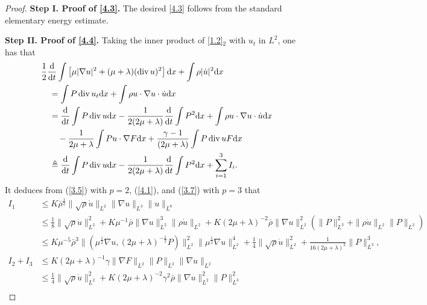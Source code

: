 \documentclass[11pt]{article}
\DeclareMathOperator{\divv}{div}
\begin{document}
\begin{proof}
{\bf Step I. Proof of \eqref{4.3}.}
The desired \eqref{4.3} follows from the standard elementary energy estimate.

{\bf Step II. Proof of \eqref{4.4}.} Taking the inner product of \eqref{1.2}$_2$ with $u_t$ in $L^2$, one has that
\begin{align}\label{4.5}
& \frac{1}{2} \frac{\mathrm{d}}{\mathrm{d} t} \int \left[ \mu |\nabla u|^2 + (\mu + \lambda )(\divv u)^2 \right] \mathrm{d} x + \int \rho |\dot{u}|^2 \mathrm{d} x\nonumber\\
& \quad = \int P \divv u_t \mathrm{d} x + \int \rho u \cdot \nabla u \cdot \dot{u} \mathrm{d} x\nonumber\\
& \quad = \frac{\mathrm{d}}{\mathrm{d} t} \int P \divv u \mathrm{d} x - \frac{1}{2 (2 \mu + \lambda )} \frac{\mathrm{d}}{\mathrm{d} t} \int P^2 \mathrm{d} x + \int \rho u \cdot \nabla u \cdot \dot{u} \mathrm{d} x \notag\\
& \qquad - \frac{1}{2\mu + \lambda } \int P u \cdot \nabla F \mathrm{d} x + \frac{\gamma - 1}{ \left(2 \mu + \lambda \right)} \int P \divv u F \mathrm{d} x\nonumber\\
& \quad \triangleq \frac{\mathrm{d}}{\mathrm{d} t} \int P \divv u \mathrm{d} x - \frac{1}{2 (2 \mu + \lambda )} \frac{\mathrm{d}}{\mathrm{d} t} \int P^2 \mathrm{d} x + \sum^3_{i = 1} I_i.
\end{align}
It deduces from (\ref{3.5}) with $p = 2$, (\ref{4.1}), and (\ref{3.7}) with $p = 3$ that
\begin{align*}
I_1
& \leq K \bar{\rho}^{\frac{1}{2}} \|\sqrt{\rho} \dot{u}\|_{L^2} \|\nabla u\|_{L^3} \|u\|_{L^6} \\
& \leq \frac{1}{8} \|\sqrt{\rho} \dot{u}\|_{L^2}^2 + K \mu^{-1} \bar{\rho} \|\nabla u\|_{L^2}^3 \|\rho \dot u\|_{L^2} + K \left(2 \mu + \lambda \right)^{-2} \bar{\rho} \|\nabla u\|_{L^2}^2 \left(\|P\|_{L^3}^2 + \|\rho \dot u\|_{L^2} \|P\|_{L^2} \right)\\
& \leq K \mu^{-5} \bar{\rho}^3 \|(\mu^{\frac{1}{2}} \nabla u, \left(2\mu + \lambda \right)^{-\frac{1}{2}} P)\|_{L^2}^2 \|\mu^{\frac{1}{2}}\nabla u\|_{L^2}^4 + \frac{1}{4} \|\sqrt{\rho} \dot{u}\|_{L^2}^2 + \frac{1}{16 (2 \mu + \lambda )^2} \|P\|_{L^3}^3,\\
I_2 + I_3
& \leq K \left(2 \mu + \lambda \right)^{-1} \gamma \|\nabla F\|_{L^2} \|P\|_{L^3} \|\nabla u\|_{L^2} \\
& \leq \frac{1}{4} \|\sqrt{\rho} \dot{u}\|_{L^2}^2 + K \left(2 \mu + \lambda \right)^{-2} \gamma^2 \bar{\rho} \|\nabla u\|_{L^2}^2 \|P\|_{L^3}^2\\

\end{align*}
\end{proof}
\end{document}
